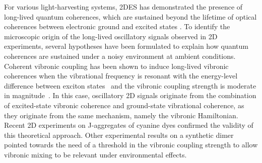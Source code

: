 \documentclass[%
 reprint,%
 amssymb, amsmath,%
 aip,cha,%
]{revtex4-1}
\begin{document}
For various light-harvesting systems, 2DES has demonstrated the presence of long-lived quantum coherences, which are sustained beyond the lifetime of optical coherences between electronic ground and excited states \cite{Engel2007,Collini2010,CaramJCP2012,FidlerJPCA2012,RomeroNP2014,Fuller2014,MilotaJPCA2013,HayesScience2013,HalpinNC2014,SongNC2014,LimNC2015}. To identify the microscopic origin of the long-lived oscillatory signals observed in 2D experiments, several hypotheses have been formulated to explain how quantum coherences are sustained under a noisy environment at ambient conditions. Coherent vibronic coupling has been shown to induce long-lived vibronic coherences when the vibrational frequency is resonant with the energy-level difference between exciton states~\cite{PriorPRL2010,ChinNJP2010,ChristenssonJPCB2012,ChinNP2013,TiwariPNAS2013,PlenioJCP2013,ChenuSR2013} and the vibronic coupling strength is moderate in magnitude~\cite{PlenioJCP2013,LimNC2015}. In this case, oscillatory 2D signals originate from the combination of excited-state vibronic coherence and ground-state vibrational coherence, as they originate from the same mechanism, namely the vibronic Hamiltonian. Recent 2D experiments on J-aggregates of cyanine dyes \cite{LimNC2015} confirmed the validity of this theoretical approach.  Other experimental results on a synthetic dimer \cite{HalpinNC2014,DuanNJP2015} pointed towards the need of a threshold in the vibronic coupling strength to allow vibronic mixing to be relevant under environmental effects.
\end{document}

